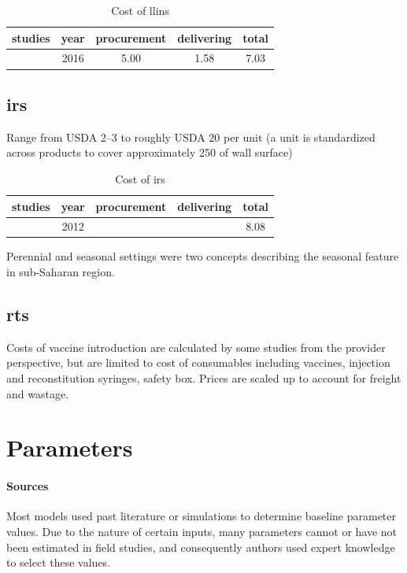 \documentclass[a4paper, 12pt, twoside]{article}
\begin{document}
\begin{table}[htpb]
	\centering
	\caption{Cost of \gls{llins}}
	\label{tab:cost_of_llins}
	\begin{tabular}{cSSSS}
		\toprule
		studies           & {year} & {procurement} & {delivering} & {total} \\
		\midrule
		\cite{Walker2016} & 2016   & 5.00          & 1.58         & 7.03    \\
		\bottomrule
	\end{tabular}
\end{table}

\subsection{\gls{irs}}
Range from USDA 2–3 to roughly USDA 20 per unit\cite{Oxborough2016}
(a unit is standardized across products to cover approximately 250 of wall surface)

\begin{table}[htpb]
	\centering
	\caption{Cost of \gls{irs}}
	\label{tab:cost_of_irs}
	\begin{tabular}{cSSSS}
		\toprule
		studies           & {year} & {procurement} & {delivering} & {total} \\
		\midrule
		\cite{Walker2016} & 2012   &               &              & 8.08    \\
		\bottomrule
	\end{tabular}
\end{table}

Perennial and seasonal settings were two concepts describing the seasonal feature in sub-Saharan region.

\subsection{\gls{rts}}%
\label{sub:rts}
Costs of vaccine introduction are calculated by some studies\cite{Hay2004} from the provider perspective, but are limited to cost of
consumables including vaccines, injection and reconstitution syringes, safety box.
Prices are scaled up to account for freight\cite{Winskill2017a} and wastage\cite{Hutton2006}.

\section{Parameters}

\paragraph{Sources}%
\label{par:sources}
Most models used past literature or simulations to determine baseline parameter values.
Due to the nature of certain inputs, many parameters cannot or have not been estimated in field studies, and consequently authors used expert knowledge to select these values.
\end{document}
